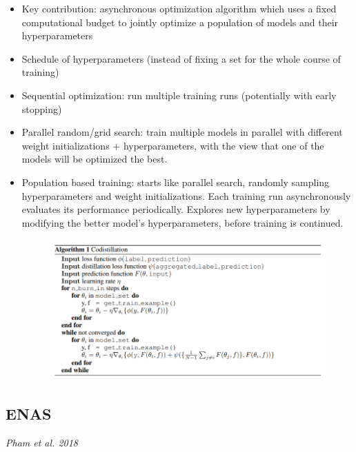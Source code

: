 \begin{itemize}
  \item Key contribution: asynchronous optimization algorithm which uses a fixed computational budget to jointly optimize a population of models and their hyperparameters
  \item Schedule of hyperparameters (instead of fixing a set for the whole course of training)
  \item Sequential optimization: run multiple training runs (potentially with early stopping)
  \item Parallel random/grid search: train multiple models in parallel with different weight initializations + hyperparameters, with the view that one of the models will be optimized the best.
  \item Population based training: starts like parallel search, randomly sampling hyperparameters and weight initializations.  Each training run asynchronously evaluates its performance periodically.  Explores new hyperparameters by modifying the better model's hyperparameters, before training is continued.

\begin{figure}[H]
   \centering
   \includegraphics[width=\textwidth]{./img/pbt.png}
\end{figure}

\end{itemize}

\subsection{ENAS}

{\it Pham et al. 2018}

